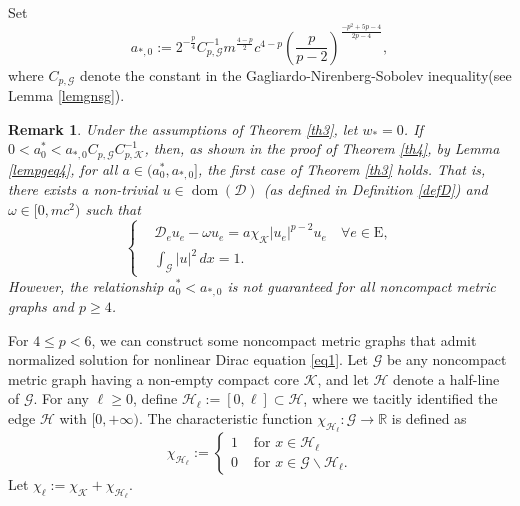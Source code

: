 \documentclass[11pt]{amsart}
\newtheorem{remark}[theorem]{Remark}
\newcommand{\abs}[1]{\lvert#1\rvert}
\newcommand{\D}{\mathcal{D}}
\newcommand{\G}{\mathcal{G}}
\newcommand{\K}{\mathcal{K}}
\numberwithin{equation}{section}
\begin{document}
Set
\begin{equation}\label{eqa*0}
    a_{*,0} := 2^{-\frac{p}{4}}C_{p,\G}^{-1}m^\frac{4-p}{2}c^{4-p}\left(\frac{p}{p-2}\right)^\frac{-p^2+5p-4}{2p-4},
\end{equation}
where $C_{p,\G}$ denote the constant in the Gagliardo-Nirenberg-Sobolev inequality(see Lemma \ref{lemgnsg}).
\begin{remark}\label{remarkp>4}
    Under the assumptions of Theorem \ref{th3}, let $w_* = 0$. If $0 < a^*_{0} < a_{*,0}C_{p,\G}C_{p,\K}^{-1}$, then, as shown in the proof of Theorem \ref{th4}, by Lemma \ref{lempgeq4}, for all $a\in (a^*_{0},a_{*,0}]$, the first case of Theorem \ref{th3} holds. That is, there exists a non-trivial $u \in \operatorname{dom}(\D)$ (as defined in Definition \ref{defD}) and $\omega \in [0, mc^2)$ such that
    \begin{equation*}
    \left\{\begin{aligned}
        &\D_e u_e - \omega u_e= a\chi_\K\abs{u_e}^{p-2}u_e \quad \forall e\in \mathrm{E},\\
        &\int_\G\abs{u}^2\,dx = 1.
    \end{aligned}
    \right.
\end{equation*}
 However, the relationship $a^*_{0} < a_{*,0}$ is not guaranteed for all noncompact metric graphs and $p \geq 4$.
\end{remark}
For $4 \leq p <6$, we can construct some noncompact metric graphs that admit normalized solution for nonlinear Dirac equation \eqref{eq1}. Let $\G$ be any noncompact metric graph having a non-empty compact core $\K$, and let $\mathcal{H}$ denote a half-line of $\G$. For any $\ell \geq 0$, define $\mathcal{H}_\ell:=[0,\ell]\subset\mathcal{H}$, where we tacitly identified the edge $\mathcal{H}$ with $[0,+\infty)$. The characteristic function  $\chi_{\mathcal{H}_\ell}: \G \to \mathbb{R}$ is defined as
\[
 \chi_{\mathcal{H}_\ell} := \begin{cases}1 & \text { for } x \in \mathcal{H}_\ell\\ 0 & \text { for } x \in \G\backslash\mathcal{H}_\ell. \end{cases}
\]
 Let $\chi_{\ell} := \chi_{\K}+\chi_{\mathcal{H}_\ell}$.
\end{document}
